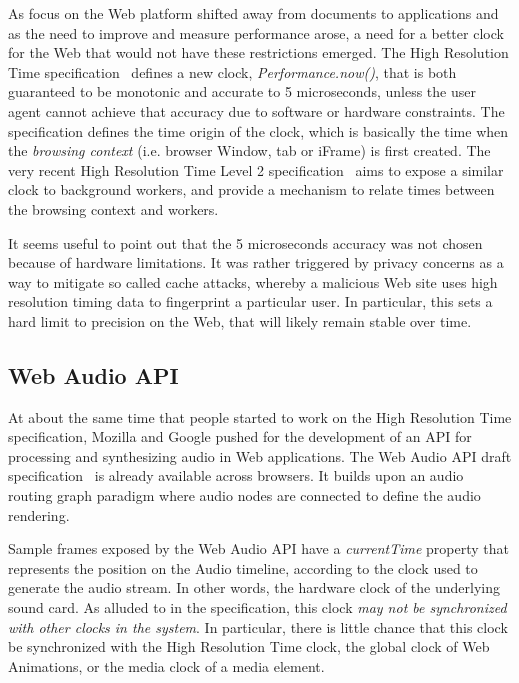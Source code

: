 \documentclass[graybox]{svmult}
\begin{document}
As focus on the Web platform shifted away from documents to applications and
as the need to improve and measure performance arose, a need for a better
clock for the Web that would not have these restrictions emerged. The High
Resolution Time specification~\cite{hrt1} defines a new clock,
\emph{Performance.now()}, that is both guaranteed to be monotonic and accurate
to 5 microseconds, unless the user agent cannot achieve that accuracy due to
software or hardware constraints. The specification defines the time origin of
the clock, which is basically the time when the \emph{browsing context} (i.e.
browser Window, tab or iFrame) is first created. The very recent High
Resolution Time Level 2 specification~\cite{hrt2} aims to expose a similar
clock to background workers, and provide a mechanism to relate times between
the browsing context and workers.

It seems useful to point out that the 5 microseconds accuracy was not chosen
because of hardware limitations. It was rather triggered by privacy concerns
as a way to mitigate so called cache attacks, whereby a malicious Web site
uses high resolution timing data to fingerprint a particular user. In
particular, this sets a hard limit to precision on the Web, that will likely
remain stable over time.


\subsection{Web Audio API}
\label{sec:webaudio}

At about the same time that people started to work on the High Resolution Time
specification, Mozilla and Google pushed for the development of an API for
processing and synthesizing audio in Web applications. The Web Audio API draft
specification~\cite{webaudio} is already available across browsers. It builds upon an
audio routing graph paradigm where audio nodes are connected to define the
audio rendering.

Sample frames exposed by the Web Audio API have a \emph{currentTime} property that
represents the position on the Audio timeline, according to the clock used to
generate the audio stream. In other words, the hardware clock of the underlying
sound card. As alluded to in the specification, this clock \emph{may not be
synchronized with other clocks in the system}. In particular, there is little
chance that this clock be synchronized with the High Resolution Time clock,
the global clock of Web Animations, or the media clock of a media element.
\end{document}
